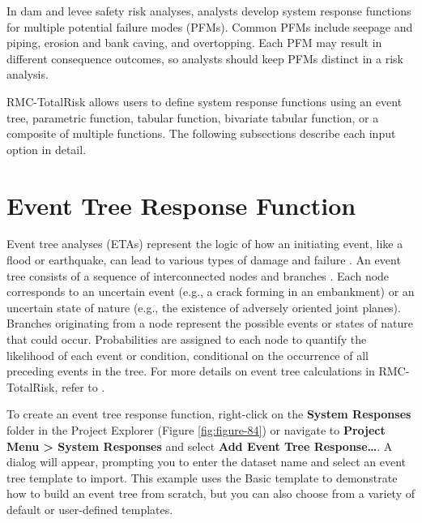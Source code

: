\documentclass[
]{book}
\begin{document}
In dam and levee safety risk analyses, analysts develop system response functions for multiple potential failure modes (PFMs). Common PFMs include seepage and piping, erosion and bank caving, and overtopping. Each PFM may result in different consequence outcomes, so analysts should keep PFMs distinct in a risk analysis.

RMC-TotalRisk allows users to define system response functions using an event tree, parametric function, tabular function, bivariate tabular function, or a composite of multiple functions. The following subsections describe each input option in detail.

\hypertarget{event-tree-response-function}{%
\section{Event Tree Response Function}\label{event-tree-response-function}}

Event tree analyses (ETAs) represent the logic of how an initiating event, like a flood or earthquake, can lead to various types of damage and failure \citep{cite-BestPractices}. An event tree consists of a sequence of interconnected nodes and branches \citep{cite-HartfordBaecher}. Each node corresponds to an uncertain event (e.g., a crack forming in an embankment) or an uncertain state of nature (e.g., the existence of adversely oriented joint planes). Branches originating from a node represent the possible events or states of nature that could occur. Probabilities are assigned to each node to quantify the likelihood of each event or condition, conditional on the occurrence of all preceding events in the tree. For more details on event tree calculations in RMC-TotalRisk, refer to \citep{cite-TechRef}.

To create an event tree response function, right-click on the \textbf{System Responses} folder in the Project Explorer (Figure \ref{fig:figure-84}) or navigate to \textbf{Project Menu \textgreater{} System Responses} and select \textbf{Add Event Tree Response\ldots{}}. A dialog will appear, prompting you to enter the dataset name and select an event tree template to import. This example uses the Basic template to demonstrate how to build an event tree from scratch, but you can also choose from a variety of default or user-defined templates.
\end{document}
